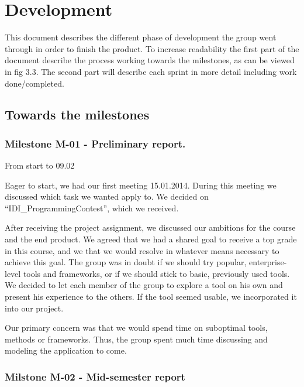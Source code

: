 
\chapter{Development}

This document describes the different phase of development the group
went through in order to finish the product. To increase readability
the first part of the document describe the process working towards the
milestones, as can be viewed in fig 3.3. The second part will describe
each sprint in more detail including work done/completed. 


\bigskip

\section{Towards the milestones}


\bigskip

\subsection{Milestone M-01 - Preliminary report.}

From start to 09.02

Eager to start, we had our first meeting 15.01.2014. During this meeting
we discussed which task we wanted apply to. We decided on
{\textquotedblleft}IDI\_ProgrammingContest{\textquotedblright}, which
we received. 


\bigskip

After receiving the project assignment, we discussed our ambitions for
the course and the end product. We agreed that we had a shared goal to
receive a top grade in this course, and we that we would resolve in
whatever means necessary to achieve this goal. The group was in doubt
if we should try popular, enterprise-level tools and frameworks, or if
we should stick to basic, previously used tools. We decided to let each
member of the group to explore a tool on his own and present his
experience to the others. If the tool seemed usable, we incorporated it
into our project.


\bigskip

Our primary concern was that we would spend time on suboptimal tools,
methods or frameworks. Thus, the group spent much time discussing and
modeling the application to come. 


\bigskip

\subsection{Milstone M-02 - Mid-semester report}

